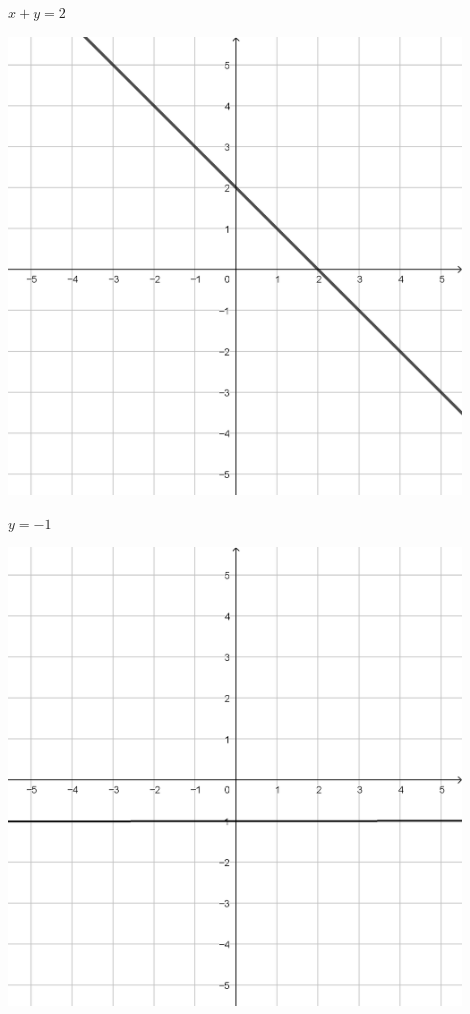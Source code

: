 \documentclass{oblivoir}
\begin{document}
\begin{minipage}{0.45\textwidth}
\begin{minipage}{0.45\textwidth}
\end{minipage}\bigskip\bigskip\par
\begin{minipage}{0.45\textwidth}\centering
\(x+y=2\)
\par\bigskip\includegraphics[width=0.9\textwidth]{L09}
\end{minipage}
\begin{minipage}{0.45\textwidth}\centering
\(y=-1\)
\par\bigskip\includegraphics[width=0.9\textwidth]{L10}

\end{minipage}
\end{minipage}
\end{document}
